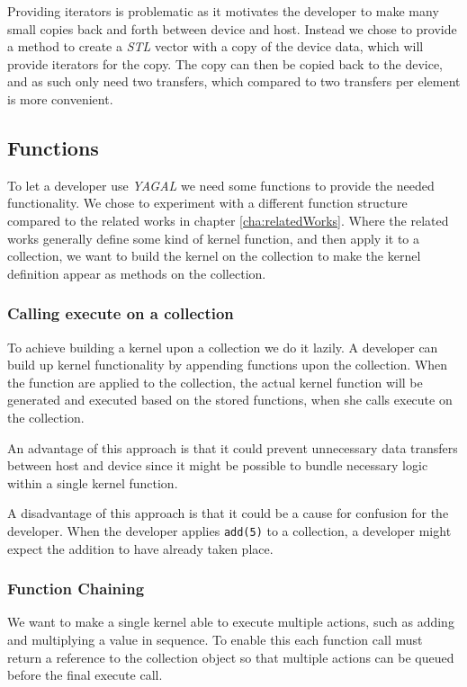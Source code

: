 Providing iterators is problematic as it motivates the developer to make many small copies back and forth between device and host. Instead we chose to provide a method to create a \textit{STL} vector with a copy of the device data, which will provide iterators for the copy. The copy can then be copied back to the device, and as such only need two transfers, which compared to two transfers per element is more convenient.

\subsection{Functions}
To let a developer use \textit{YAGAL} we need some functions to provide the needed functionality. We chose to experiment with a different function structure compared to the related works in chapter \ref{cha:relatedWorks}. Where the related works generally define some kind of kernel function, and then apply it to a collection, we want to build the kernel on the collection to make the kernel definition appear as methods on the collection.

\subsubsection{Calling execute on a collection}
To achieve building a kernel upon a collection we do it lazily. A developer can build up kernel functionality by appending functions upon the collection. When the function are applied to the collection, the actual kernel function will be generated and executed based on the stored functions, when she calls execute on the collection.

An advantage of this approach is that it could prevent unnecessary data transfers between host and device since it might be possible to bundle necessary logic within a single kernel function. 

A disadvantage of this approach is that it could be a cause for confusion for the developer. When the developer applies \texttt{add(5)} to a collection, a developer might expect the addition to have already taken place.

\subsubsection{Function Chaining}
We want to make a single kernel able to execute multiple actions, such as adding and multiplying a value in sequence. To enable this each function call must return a reference to the collection object so that multiple actions can be queued before the final execute call.

